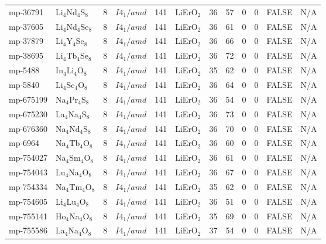 {\begin{longtable}{llcccccccccc}
    mp-36791 & Li$_{4}$Nd$_{4}$S$_{8}$ & 8     & $I4_1/amd$ & 141   & LiErO$_{2}$ & 36    & 57    & 0     & 0     & FALSE & N/A \\
    mp-37605 & Li$_{4}$Nd$_{4}$Se$_{8}$ & 8     & $I4_1/amd$ & 141   & LiErO$_{2}$ & 36    & 61    & 0     & 0     & FALSE & N/A \\
    mp-37879 & Li$_{4}$Y$_{4}$Se$_{8}$ & 8     & $I4_1/amd$ & 141   & LiErO$_{2}$ & 36    & 66    & 0     & 0     & FALSE & N/A \\
    mp-38695 & Li$_{4}$Tb$_{4}$Se$_{8}$ & 8     & $I4_1/amd$ & 141   & LiErO$_{2}$ & 36    & 72    & 0     & 0     & FALSE & N/A \\
    mp-5488 & In$_{4}$Li$_{4}$O$_{8}$ & 8     & $I4_1/amd$ & 141   & LiErO$_{2}$ & 35    & 62    & 0     & 0     & FALSE & N/A \\
    mp-5840 & Li$_{4}$Sc$_{4}$O$_{8}$ & 8     & $I4_1/amd$ & 141   & LiErO$_{2}$ & 36    & 64    & 0     & 0     & FALSE & N/A \\
    mp-675199 & Na$_{4}$Pr$_{4}$S$_{8}$ & 8     & $I4_1/amd$ & 141   & LiErO$_{2}$ & 36    & 54    & 0     & 0     & FALSE & N/A \\
    mp-675230 & La$_{4}$Na$_{4}$S$_{8}$ & 8     & $I4_1/amd$ & 141   & LiErO$_{2}$ & 36    & 73    & 0     & 0     & FALSE & N/A \\
    mp-676360 & Na$_{4}$Nd$_{4}$S$_{8}$ & 8     & $I4_1/amd$ & 141   & LiErO$_{2}$ & 36    & 70    & 0     & 0     & FALSE & N/A \\
    mp-6964 & Na$_{4}$Tb$_{4}$O$_{8}$ & 8     & $I4_1/amd$ & 141   & LiErO$_{2}$ & 36    & 60    & 0     & 0     & FALSE & N/A \\
    mp-754027 & Na$_{4}$Sm$_{4}$O$_{8}$ & 8     & $I4_1/amd$ & 141   & LiErO$_{2}$ & 36    & 61    & 0     & 0     & FALSE & N/A \\
    mp-754043 & Lu$_{4}$Na$_{4}$O$_{8}$ & 8     & $I4_1/amd$ & 141   & LiErO$_{2}$ & 36    & 67    & 0     & 0     & FALSE & N/A \\
    mp-754334 & Na$_{4}$Tm$_{4}$O$_{8}$ & 8     & $I4_1/amd$ & 141   & LiErO$_{2}$ & 35    & 62    & 0     & 0     & FALSE & N/A \\
    mp-754605 & Li$_{4}$Lu$_{4}$O$_{8}$ & 8     & $I4_1/amd$ & 141   & LiErO$_{2}$ & 36    & 51    & 0     & 0     & FALSE & N/A \\
    mp-755141 & Ho$_{4}$Na$_{4}$O$_{8}$ & 8     & $I4_1/amd$ & 141   & LiErO$_{2}$ & 35    & 69    & 0     & 0     & FALSE & N/A \\
    mp-755586 & La$_{4}$Na$_{4}$O$_{8}$ & 8     & $I4_1/amd$ & 141   & LiErO$_{2}$ & 37    & 54    & 0     & 0     & FALSE & N/A \\

\end{longtable}}
